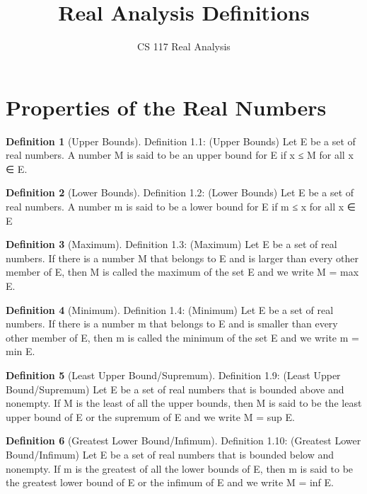 \documentclass[11pt]{article}
\title{Real Analysis Definitions}
\author{CS 117 Real Analysis}
\theoremstyle{definition}
\newtheorem{definition}{Definition}[section]
\begin{document}
\maketitle

\section{Properties of the Real Numbers}
\begin{definition}[Upper Bounds]
	Definition 1.1: (Upper Bounds) Let E be a set of real numbers. A number M is said to be an upper bound for E if x ≤ M for all x ∈ E.
\end{definition}


\begin{definition} [Lower Bounds]
	Definition 1.2: (Lower Bounds) Let E be a set of real numbers. A number m is said to be a lower
bound for E if m ≤ x for all x ∈ E
\end{definition}


\begin{definition} [Maximum]
	Definition 1.3: (Maximum) Let E be a set of real numbers. If there is a number M that belongs to E and is larger than every other member of E, then M is called the maximum of the set E and we write M = max E.
\end{definition}


\begin{definition} [Minimum]
	Definition 1.4: (Minimum) Let E be a set of real numbers. If there is a number m that belongs to E and is smaller than every other member of E, then m is called the minimum of the set E and we write m = min E.
\end{definition}


\setcounter{definition}{8}
\begin{definition} [Least Upper Bound/Supremum]
	Definition 1.9: (Least Upper Bound/Supremum) Let E be a set of real numbers that is bounded
	above and nonempty. If M is the least of all the upper bounds, then M is said to be the least upper bound of E or the supremum of E and we write M = sup E.
\end{definition}


\begin{definition} [Greatest Lower Bound/Infimum]
	Definition 1.10: (Greatest Lower Bound/Infimum) Let E be a set of real numbers that is bounded below and nonempty. If m is the greatest of all the lower bounds of E, then m is said to be the greatest lower bound of E or the infimum of E and we write M = inf E.
\end{definition}
\end{document}

